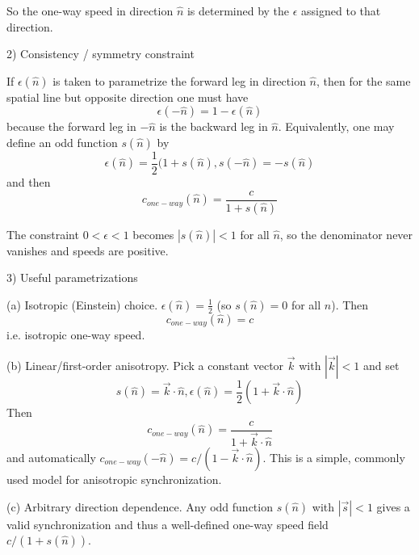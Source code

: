 \documentclass[a4paper]{article}
\theoremstyle{plain}
\theoremstyle{definition}
\newcommand{\vect}[1]{\vec{#1}}
\newcommand{\hatvec}[1]{\hat{#1}}
\begin{document}
So the one-way speed in direction $\hatvec{n}$
is determined by the $\epsilon$ assigned to that direction.

2) Consistency / symmetry constraint

If $\epsilon(\hatvec{n})$
is taken to parametrize the forward leg in direction $\hatvec{n}$,
then for the same spatial line but opposite direction one must have
\begin{equation}
\epsilon(-\hatvec{n}) = 1 - \epsilon(\hatvec{n})
\end{equation}
because the forward leg in $-\hatvec{n}$
is the backward leg in $\hatvec{n}$.
Equivalently, one may define an odd function $s(\hatvec{n})$ by
\begin{equation}
\epsilon(\hatvec{n}) = \frac{1}{2}(1 + s(\hatvec{n}), s(-\hatvec{n}) = -s(\hatvec{n})
\end{equation}
and then
\begin{equation}
c_{one-way}(\hatvec{n}) = \frac{c}{1 + s(\hatvec{n})}
\end{equation}

The constraint $0 < \epsilon < 1$ becomes $|s(\hatvec{n})| < 1$
for all $\hatvec{n}$, so the denominator never vanishes
and speeds are positive.

3) Useful parametrizations

(a) Isotropic (Einstein) choice. $\epsilon(\hatvec{n}) = \frac{1}{2}$
(so $s(\hatvec{n})=0$ for all $\hatvec{n}$).  Then
\begin{equation}
c_{one-way}(\hatvec{n}) = c
\end{equation}
i.e. isotropic one-way speed.

(b) Linear/first-order anisotropy.  Pick a constant vector $\vect{k}$
with $|\vect{k}| < 1$ and set
\begin{equation}
s(\hatvec{n}) = \vect{k} \cdot \hatvec{n}, \epsilon(\hatvec{n}) = \frac{1}{2} (1 + \vect{k} \cdot \hatvec{n})
\end{equation}
Then
\begin{equation}
c_{one-way}(\hatvec{n}) = \frac{c}{1 + \vect{k} \cdot \hatvec{n}}
\end{equation}
and automatically
$c_{one-way}(-\hatvec{n}) = c / (1 - \vect{k} \cdot \hatvec{n})$.
This is a simple, commonly used model for anisotropic synchronization.

(c) Arbitrary direction dependence. Any odd function $s(\hatvec{n})$
with $|\vect{s}| < 1$ gives a valid synchronization
and thus a well-defined one-way speed field $c/(1+s(\hatvec{n}))$.
\end{document}
